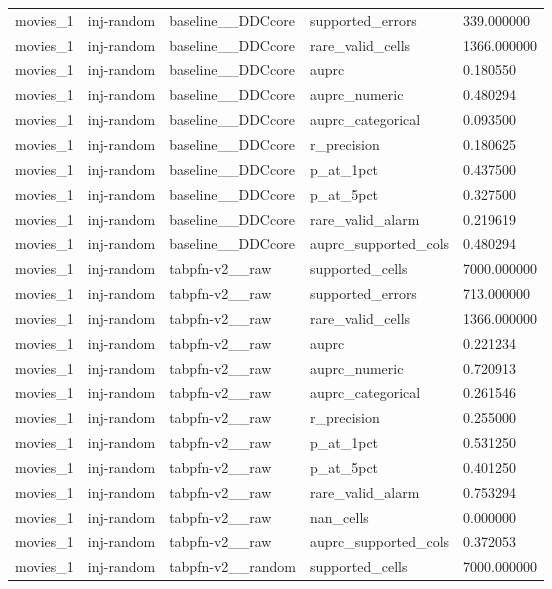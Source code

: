 \begin{tabular}{lllll}
movies\_1 & inj-random & baseline\_\_DDCcore & supported\_errors & 339.000000 \\
movies\_1 & inj-random & baseline\_\_DDCcore & rare\_valid\_cells & 1366.000000 \\
movies\_1 & inj-random & baseline\_\_DDCcore & auprc & 0.180550 \\
movies\_1 & inj-random & baseline\_\_DDCcore & auprc\_numeric & 0.480294 \\
movies\_1 & inj-random & baseline\_\_DDCcore & auprc\_categorical & 0.093500 \\
movies\_1 & inj-random & baseline\_\_DDCcore & r\_precision & 0.180625 \\
movies\_1 & inj-random & baseline\_\_DDCcore & p\_at\_1pct & 0.437500 \\
movies\_1 & inj-random & baseline\_\_DDCcore & p\_at\_5pct & 0.327500 \\
movies\_1 & inj-random & baseline\_\_DDCcore & rare\_valid\_alarm & 0.219619 \\
movies\_1 & inj-random & baseline\_\_DDCcore & auprc\_supported\_cols & 0.480294 \\
movies\_1 & inj-random & tabpfn-v2\_\_raw & supported\_cells & 7000.000000 \\
movies\_1 & inj-random & tabpfn-v2\_\_raw & supported\_errors & 713.000000 \\
movies\_1 & inj-random & tabpfn-v2\_\_raw & rare\_valid\_cells & 1366.000000 \\
movies\_1 & inj-random & tabpfn-v2\_\_raw & auprc & 0.221234 \\
movies\_1 & inj-random & tabpfn-v2\_\_raw & auprc\_numeric & 0.720913 \\
movies\_1 & inj-random & tabpfn-v2\_\_raw & auprc\_categorical & 0.261546 \\
movies\_1 & inj-random & tabpfn-v2\_\_raw & r\_precision & 0.255000 \\
movies\_1 & inj-random & tabpfn-v2\_\_raw & p\_at\_1pct & 0.531250 \\
movies\_1 & inj-random & tabpfn-v2\_\_raw & p\_at\_5pct & 0.401250 \\
movies\_1 & inj-random & tabpfn-v2\_\_raw & rare\_valid\_alarm & 0.753294 \\
movies\_1 & inj-random & tabpfn-v2\_\_raw & nan\_cells & 0.000000 \\
movies\_1 & inj-random & tabpfn-v2\_\_raw & auprc\_supported\_cols & 0.372053 \\
movies\_1 & inj-random & tabpfn-v2\_\_random & supported\_cells & 7000.000000 \\

\end{tabular}
